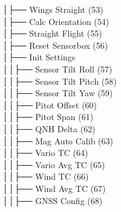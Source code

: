 │\hspace{2em}├── Wings Straight (53) \\
│\hspace{2em}├── Calc Orientation (54) \\
│\hspace{2em}├── Straight Flight (55) \\
│\hspace{2em}├── Reset Sensorbox (56) \\
│\hspace{2em}├── Init Settings \\
│\hspace{2em}│\hspace{2em}├── Sensor Tilt Roll (57) \\
│\hspace{2em}│\hspace{2em}├── Sensor Tilt Pitch (58) \\
│\hspace{2em}│\hspace{2em}├── Sensor Tilt Yaw (59) \\
│\hspace{2em}│\hspace{2em}├── Pitot Offset (60) \\
│\hspace{2em}│\hspace{2em}├── Pitot Span (61) \\
│\hspace{2em}│\hspace{2em}├── QNH Delta (62) \\
│\hspace{2em}│\hspace{2em}├── Mag Auto Calib (63) \\
│\hspace{2em}│\hspace{2em}├── Vario TC (64) \\
│\hspace{2em}│\hspace{2em}├── Vario Avg TC (65) \\
│\hspace{2em}│\hspace{2em}├── Wind TC (66) \\
│\hspace{2em}│\hspace{2em}├── Wind Avg TC (67) \\
│\hspace{2em}│\hspace{2em}├── GNSS Config (68) \\
